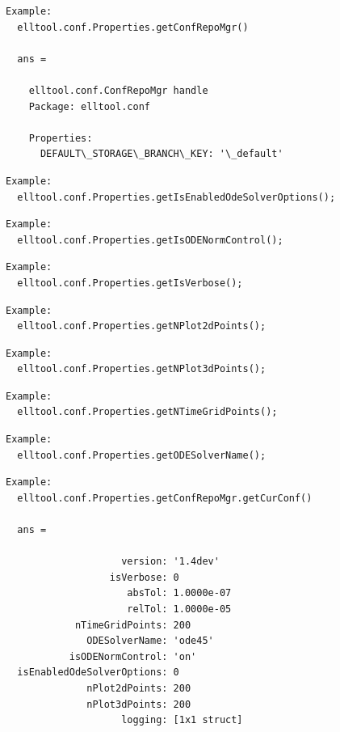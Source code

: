 \documentclass[letterpaper,10pt,english]{sphinxmanual}
\begin{document}
\begin{Verbatim}[commandchars=\\\{\}]
Example:
  elltool.conf.Properties.getConfRepoMgr()

  ans =

    elltool.conf.ConfRepoMgr handle
    Package: elltool.conf

    Properties:
      DEFAULT\_STORAGE\_BRANCH\_KEY: '\_default'
\end{Verbatim}

\begin{Verbatim}[commandchars=\\\{\}]
Example:
  elltool.conf.Properties.getIsEnabledOdeSolverOptions();
\end{Verbatim}

\begin{Verbatim}[commandchars=\\\{\}]
Example:
  elltool.conf.Properties.getIsODENormControl();
\end{Verbatim}

\begin{Verbatim}[commandchars=\\\{\}]
Example:
  elltool.conf.Properties.getIsVerbose();
\end{Verbatim}

\begin{Verbatim}[commandchars=\\\{\}]
Example:
  elltool.conf.Properties.getNPlot2dPoints();
\end{Verbatim}

\begin{Verbatim}[commandchars=\\\{\}]
Example:
  elltool.conf.Properties.getNPlot3dPoints();
\end{Verbatim}

\begin{Verbatim}[commandchars=\\\{\}]
Example:
  elltool.conf.Properties.getNTimeGridPoints();
\end{Verbatim}

\begin{Verbatim}[commandchars=\\\{\}]
Example:
  elltool.conf.Properties.getODESolverName();
\end{Verbatim}

\begin{Verbatim}[commandchars=\\\{\}]
Example:
  elltool.conf.Properties.getConfRepoMgr.getCurConf()

  ans =

                    version: '1.4dev'
                  isVerbose: 0
                     absTol: 1.0000e-07
                     relTol: 1.0000e-05
            nTimeGridPoints: 200
              ODESolverName: 'ode45'
           isODENormControl: 'on'
  isEnabledOdeSolverOptions: 0
              nPlot2dPoints: 200
              nPlot3dPoints: 200
                    logging: [1x1 struct]
\end{Verbatim}
\end{document}

